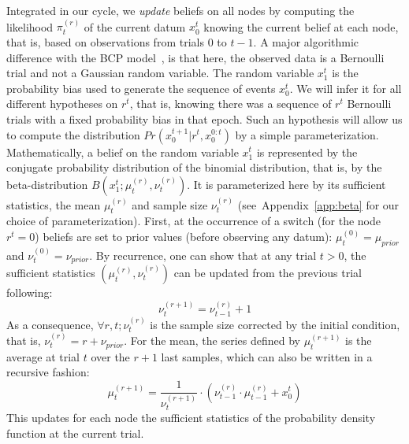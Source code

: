 \documentclass[10pt,letterpaper]{article}
\newcommand{\eql}[1]{\begin{equation}#1\end{equation}}
\newcommand{\citep}[1]{\cite{#1}}
\newcommand{\seeFig}[1]{Figure~\ref{fig:#1}}
\newcommand{\seeEq}[1]{Equation~\ref{eq:#1}}
\newcommand{\seeApp}[1]{Appendix~\ref{app:#1}}
\begin{document}
Integrated in our cycle, we \emph{update} beliefs on all nodes
by computing the likelihood $\pi^{(r)}_t$ of the current datum $x_0^{t}$
knowing the current belief at each node,
that is, based on observations from trials $0$ to $t-1$. %
A major algorithmic difference with the BCP model~\citep{AdamsMackay2007},
is that here, the observed data is a Bernoulli trial and not a Gaussian random variable.
The random variable $x_1^t$ is the probability bias used
to generate the sequence of events $x_0^t$.
We will infer it for all different hypotheses on $r^t$,
that is, knowing there was a sequence of $r^t$ Bernoulli trials
with a fixed probability bias in that epoch.
Such an hypothesis will allow us to compute the distribution
$Pr(x_0^{t+1} | r^{t}, x_0^{0:t})$
by a simple parameterization.
Mathematically, a belief on the random variable $x_1^t$ is represented
by the conjugate probability distribution of the binomial distribution,
that is, by the beta-distribution $B(x_1^t; \mu^{(r)}_{t}, \nu^{(r)}_{t})$.
It is parameterized here by its sufficient statistics,
the mean $\mu^{(r)}_{t}$ and sample size $\nu^{(r)}_{t}$ %
(see~\seeApp{beta} for our choice of parameterization).
First, at the occurrence of a switch (for the node $r^t=0$)
beliefs are set to prior values (before observing any datum):
$\mu^{(0)}_{t} = \mu_{prior}$ and $\nu^{(0)}_{t} = \nu_{prior}$.
By recurrence, %
one can show that at any trial $t>0$,
the sufficient statistics $(\mu^{(r)}_{t}, \nu^{(r)}_{t})$
can be updated from the previous trial following:
\eql{
\nu^{(r+1)}_{t} = \nu^{(r)}_{t-1} + 1
\label{eq:update_nu}
}
As a consequence, $\forall r, t; \nu^{(r)}_{t}$ is the sample size corrected by the initial condition, that is,
$\nu^{(r)}_{t} = r + \nu_{prior}$. For the mean, the series defined by $\mu^{(r+1)}_{t}$ is the average at trial $t$ over the $r+1$ last samples, which can also be written in a recursive fashion:
\eql{
\mu^{(r+1)}_{t} = \frac{1}{\nu^{(r+1)}_{t}} \cdot (\nu^{(r)}_{t-1} \cdot \mu^{(r)}_{t-1} +  x_0^{t})
\label{eq:update_mu}
}
This updates for each node the sufficient statistics of the probability density function at the current trial.
\end{document}

